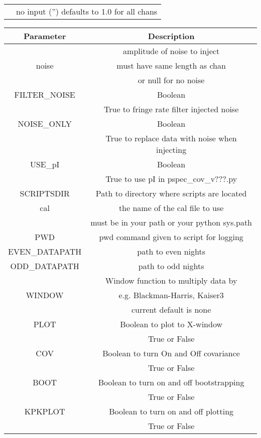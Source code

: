\documentclass[onecolumn]{emulateapj}
\begin{document}
{{\begin{sidewaystable}[h]
\begin{tabular}{c | c}
	  & no input ('') defaults to 1.0 for all chans 
\end{tabular}
\begin{tabular}{c | c}
Parameter & Description  \\ \hline 
      & amplitude of noise to inject \\
 noise	  & must have same length as chan\\
 	  & or null for no noise\\ \hline
FILTER\_NOISE & Boolean \\
	  & True to fringe rate filter injected noise\\ \hline
NOISE\_ONLY & Boolean \\
	  & True to replace data with noise when injecting \\ \hline
USE\_pI & Boolean \\
	   & True to use pI in pspec\_cov\_v???.py \\ \hline
SCRIPTSDIR &  Path to directory where scripts are located\\ \hline
cal & the name of the cal file to use \\ 
	&  must be in your path or your python sys.path \\ \hline
PWD & pwd command given to script for logging \\ \hline
EVEN\_DATAPATH & path to even nights \\ \hline
ODD\_DATAPATH & path to odd nights\\ \hline 
 	& Window function to multiply data by \\ \hline
WINDOW 	& e.g. Blackman-Harris, Kaiser3\\
	& current default is none\\ \hline
 PLOT & Boolean to plot to X-window \\
 	& True or False \\ \hline
COV  & Boolean to turn On and Off covariance \\
	& True or False\\ \hline
BOOT & Boolean to turn on and off bootstrapping \\
	& True or False \\ \hline
KPKPLOT & Boolean to turn on and off plotting\\
		& True or False
\end{tabular}
	
\caption{\label{tab:parms}List of Parameters used in configuration file for use with mk\_psa128\_pspec.sh}
\end{sidewaystable}


}}
\end{document}
